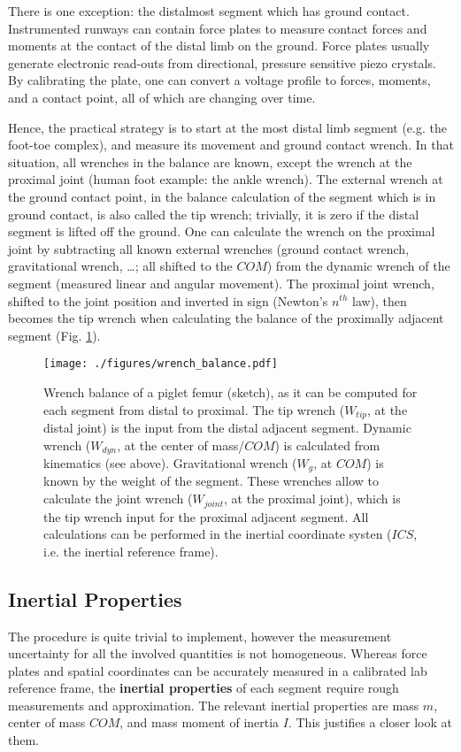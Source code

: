 \documentclass[10pt,a4paper]{article}
\begin{document}
There is one exception: the distalmost segment which has ground contact.
Instrumented runways can contain force plates to measure contact forces and moments at the contact of the distal limb on the ground.
Force plates usually generate electronic read-outs from directional, pressure sensitive piezo crystals.
By calibrating the plate, one can convert a voltage profile to forces, moments, and a contact point, all of which are changing over time.


Hence, the practical strategy \citep{Robertson2013,Lynch2017,Dumas2004} is to start at the most distal limb segment (e.g. the foot-toe complex), and measure its movement and ground contact wrench.
In that situation, all wrenches in the balance are known, except the wrench at the proximal joint (human foot example: the ankle wrench).
The external wrench at the ground contact point, in the balance calculation of the segment which is in ground contact, is also called the tip wrench; trivially, it is zero if the distal segment is lifted off the ground.
One can calculate the wrench on the proximal joint by subtracting all known external wrenches (ground contact wrench, gravitational wrench, \ldots{}; all shifted to the \(COM\)) from the dynamic wrench of the segment (measured linear and angular movement).
The proximal joint wrench, shifted to the joint position and inverted in sign (Newton's \(n^{th}\) law), then becomes the tip wrench when calculating the balance of the proximally adjacent segment (Fig. \ref{fig:wrenchbalance}).

\begin{figure}[htbp]
\centering
\texttt{[image: ./figures/wrench\_balance.pdf]}
\caption{\label{fig:wrenchbalance}Wrench balance of a piglet femur (sketch), as it can be computed for each segment from distal to proximal. The tip wrench (\(W_{tip}\), at the distal joint) is the input from the distal adjacent segment. Dynamic wrench (\(W_{dyn}\), at the center of mass/\(COM\)) is calculated from kinematics (see above). Gravitational wrench (\(W_{g}\), at \(COM\)) is known by the weight of the segment. These wrenches allow to calculate the joint wrench (\(W_{joint}\), at the proximal joint), which is the tip wrench input for the proximal adjacent segment. All calculations can be performed in the inertial coordinate systen (\(ICS\), i.e. the inertial reference frame).}
\end{figure}


\subsection{Inertial Properties}
\label{sec:org4916f2f}
The procedure is quite trivial to implement, however the measurement uncertainty for all the involved quantities is not homogeneous.
Whereas force plates and spatial coordinates can be accurately measured in a calibrated lab reference frame, the \textbf{inertial properties} of each segment require rough measurements and approximation.
The relevant inertial properties are mass \(m\), center of mass \(COM\), and mass moment of inertia \(I\).
This justifies a closer look at them.
\end{document}
